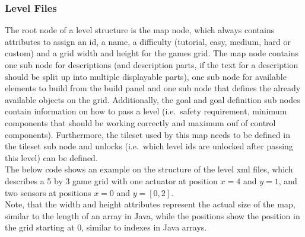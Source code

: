 \subsubsection{Level Files}\label{subsubsec:level-files}
The root node of a level structure is the map node, which always contains attributes to assign an id, a name, a difficulty (tutorial, easy, medium, hard or custom) and a
grid width and height for the games grid.
The map node contains one sub node for descriptions (and description parts, if the text for a description should be split up into multiple displayable parts),
one sub node for available elements to build from the build panel and one sub node that defines the already available objects on the grid.
Additionally, the goal and goal definition sub nodes contain information on how to pass a level (i.e.\ safety requirement, minimum components that should be working correctly and
maximum ouf of control components).
Furthermore, the tileset used by this map needs to be defined in the tileset sub node and unlocks (i.e.\ which level ids are unlocked after passing this level) can be defined.
\\
The below code shows an example on the structure of the level xml files, which describes a 5 by 3 game grid with one actuator
at position $x = 4$ and $y = 1$, and two sensors at positions $x = 0$ and $y = [0, 2]$.
\\
Note, that the width and height attributes represent the actual size of the map, similar to the length of an array in Java, while
the positions show the position in the grid starting at 0, similar to indexes in Java arrays.
\\
\\
